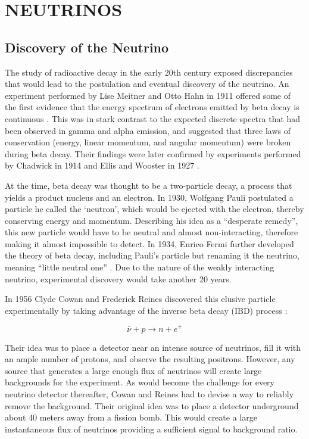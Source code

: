 \chapter{\uppercase{Neutrinos}} \label{ch:Neutrinos}

\section{Discovery of the Neutrino} \label{sec:NeutrinoDiscovery}

The study of radioactive decay in the early 20th century exposed discrepancies that would lead to the postulation and eventual discovery of the neutrino.
An experiment performed by Lise Meitner and Otto Hahn in 1911 offered some of the first evidence that the energy spectrum of electrons emitted by beta decay is continuous \cite{Hahn:1911}. 
This was in stark contrast to the expected discrete spectra that had been observed in gamma and alpha emission, and suggested that three laws of conservation (energy, linear momentum, and angular momentum) were broken during beta decay. 
Their findings were later confirmed by experiments performed by Chadwick in 1914 \cite{Chadwick:1914zz} and Ellis and Wooster in 1927 \cite{Ellis:1927}. 

At the time, beta decay was thought to be a two-particle decay, a process that yields a product nucleus and an electron.
In 1930, Wolfgang Pauli postulated a particle he called the `neutron', which would be ejected with the electron, thereby conserving energy and momentum.
Describing his idea as a ``desperate remedy'', this new particle would have to be neutral and almost non-interacting, therefore making it almost impossible to detect.
In 1934, Enrico Fermi further developed the theory of beta decay, including Pauli's particle but renaming it the neutrino, meaning ``little neutral one'' \cite{Fermi:1934hr}.
Due to the nature of the weakly interacting neutrino, experimental discovery would take another 20 years.

In 1956 Clyde Cowan and Frederick Reines discovered this elusive particle experimentally by taking advantage of the inverse beta decay (IBD) process \cite{Cowan}:

\begin{equation}
	\bar{\nu} + p \rightarrow n + e^{+}
\end{equation}

Their idea was to place a detector near an intense source of neutrinos, fill it with an ample number of protons, and observe the resulting positrons. 
However, any source that generates a large enough flux of neutrinos will create large backgrounds for the experiment. 
As would become the challenge for every neutrino detector thereafter, Cowan and Reines had to devise a way to reliably remove the background.
Their original idea was to place a detector underground about 40 meters away from a fission bomb. 
This would create a large instantaneous flux of neutrinos providing a sufficient signal to background ratio. 

